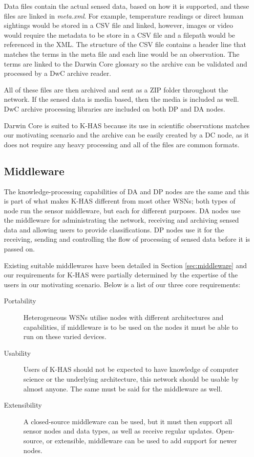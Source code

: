 

Data files contain the actual sensed data, based on how it is supported, and these files are linked in \textit{meta.xml}. For example, temperature readings or direct human sightings would be stored in a CSV file and linked, however, images or video would require the metadata to be store in a CSV file and a filepath would be referenced in the XML. The structure of the CSV file contains a header line that matches the terms in the meta file and each line would be an observation. The terms are linked to the Darwin Core glossary so the archive can be validated and processed by a DwC archive reader.

All of these files are then archived and sent as a ZIP folder throughout the network. If the sensed data is media based, then the media is included as well. DwC archive processing libraries are included on both DP and DA nodes.

Darwin Core is suited to K-HAS because its use in scientific observations matches our motivating scenario and the archive can be easily created by a DC node, as it does not require any heavy processing and all of the files are common formats.
	
	\subsection{Middleware}
	The knowledge-processing capabilities of DA and DP nodes are the same and this is part of what makes K-HAS different from most other WSNs; both types of node run the sensor middleware, but each for different purposes. DA nodes use the middleware for administrating the network, receiving and archiving sensed data and allowing users to provide classifications. DP nodes use it for the receiving, sending and controlling the flow of processing of sensed data before it is passed on.
	
	Existing suitable middlewares have been detailed in Section \ref{sec:middleware} and our requirements for K-HAS were partially determined by the expertise of the users in our motivating scenario. Below is a list of our three core requirements:
	\begin{description}
		\item[Portability] Heterogeneous WSNs utilise nodes with different architectures and capabilities, if middleware is to be used on the nodes it must be able to run on these varied devices. 
		\item[Usability] Users of K-HAS should not be expected to have knowledge of computer science or the underlying architecture, this network should be usable by almost anyone. The same must be said for the middleware as well.
		\item[Extensibility] A closed-source middleware can be used, but it must then support all sensor nodes and data types, as well as receive regular updates. Open-source, or extensible, middleware can be used to add support for newer nodes.
	\end{description}
	
